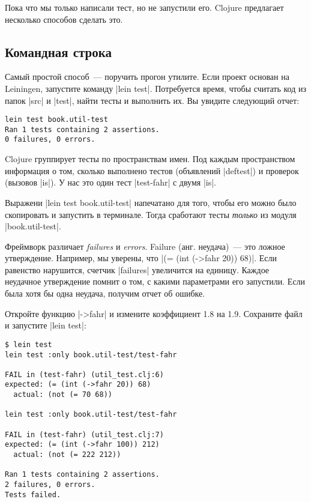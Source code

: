 Пока что мы только написали тест, но не запустили его. Clojure предлагает
несколько способов сделать это.

\subsection{Командная строка}

Самый простой способ~--- поручить прогон утилите. Если проект основан на
Leiningen, запустите команду \spverb|lein test|.
Потребуется время, чтобы считать код из папок \spverb|src| и
\spverb|test|, найти тесты и выполнить их. Вы увидите следующий отчет:

\begin{verbatim}
lein test book.util-test
Ran 1 tests containing 2 assertions.
0 failures, 0 errors.
\end{verbatim}

Clojure группирует тесты по пространствам имен. Под каждым пространством
информация о том, сколько выполнено тестов (объявлений \spverb|deftest|) и
проверок (вызовов \spverb|is|). У нас это один тест \spverb|test-fahr| с двумя
\spverb|is|.

Выражени \spverb|lein test book.util-test| напечатано для того, чтобы его можно
было скопировать и запустить в терминале. Тогда сработают тесты \emph{только} из
модуля \spverb|book.util-test|.

Фреймворк различает \emph{failures} и \emph{errors}. Failure (анг. неудача)~---
это ложное утверждение. Например, мы уверены, что \spverb|(= (int (->fahr 20)) 68)|.
Если равенство нарушится, счетчик \spverb|failures| увеличится на
единицу. Каждое неудачное утверждение помнит о том, с какими параметрами его
запустили. Если была хотя бы одна неудача, получим отчет об ошибке.

Откройте функцию \spverb|->fahr| и измените коэффициент 1.8 на 1.9. Сохраните
файл и запустите \spverb|lein test|:

\begin{verbatim}
$ lein test
lein test :only book.util-test/test-fahr

FAIL in (test-fahr) (util_test.clj:6)
expected: (= (int (->fahr 20)) 68)
  actual: (not (= 70 68))

lein test :only book.util-test/test-fahr

FAIL in (test-fahr) (util_test.clj:7)
expected: (= (int (->fahr 100)) 212)
  actual: (not (= 222 212))

Ran 1 tests containing 2 assertions.
2 failures, 0 errors.
Tests failed.
\end{verbatim}

